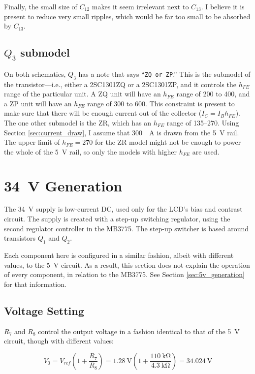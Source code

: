 \documentclass{article}
\newcommand{\model}{\textsf}
\begin{document}
Finally, the small size of $C_{12}$ makes it seem irrelevant next to
$C_{13}$. I believe it is present to reduce very small ripples, which
would be far too small to be absorbed by $C_{13}$.

\subsection{$Q_3$ submodel}
\label{sec:q3_submodel}
On both schematics, $Q_3$ has a note that says ``\texttt{ZQ or ZP}.''
This is the submodel of the transistor---i.e., either a
\model{2SC1301ZQ} or a \model{2SC1301ZP}, and it controls the $h_{FE}$
range of the particular unit. A \model{ZQ} unit will have an $h_{FE}$
range of 200 to 400, and a \model{ZP} unit will have an $h_{FE}$
range of 300 to 600. This constraint is present to make sure that
there will be enough current out of the collector ($I_C =
I_Bh_{FE}$). The one other submodel is the \model{ZR}, which has an
$h_{FE}$ range of 135--270. Using Section \ref{sec:current_draw}, I
assume that \qty{300}{\milli{}A} is drawn from the \qty{5}{\volt}
rail. The upper limit of $h_{FE} = 270$ for the \model{ZR} model
might not be enough to power the whole of the \qty{5}{\volt} rail, so
only the models with higher $h_{FE}$ are used.

\section{\qty{34}{\volt} Generation}
The \qty{34}{\volt} supply is low-current DC, used only for the LCD's
bias and contrast circuit. The supply is created with a step-up
switching regulator, using the second regulator controller in the
\model{MB3775}. The step-up switcher is based around transistors $Q_1$
and $Q_2$.

Each component here is configured in a similar fashion, albeit with
different values, to the \qty{5}{\volt} circuit. As a result, this
section does not explain the operation of every component, in relation
to the \model{MB3775}. See Section \ref{sec:5v_generation} for that
information.

\subsection{Voltage Setting}
$R_7$ and $R_8$ control the output voltage in a fashion identical to
that of the \qty{5}{\volt} circuit, though with different values:

\begin{displaymath}
  V_0 = V_{ref}\left(1+\frac{R_7}{R_8}\right) =
  \qty{1.28}{\volt}\left(1+\frac{\qty{110}{\kilo\ohm}}{\qty{4.3}{\kilo\ohm}}\right)
  = \qty{34.024}{\volt}
\end{displaymath}
\end{document}
